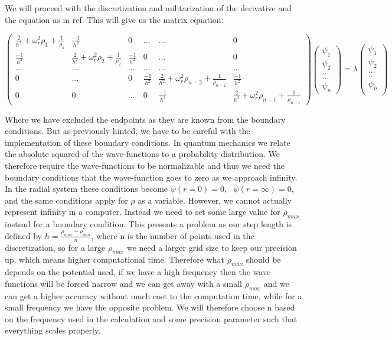 \documentclass[a4paper,11pt]{article}
\begin{document}
{We will proceed with the discretization and militarization of the derivative and the equation as in ref\cite{Project1}. This will give us the matrix equation:


\begin{equation}
\begin{pmatrix}
	\frac{2}{h^2} + \omega_r^2 \rho_1 + \frac{1}{\rho_1} & \frac{-1}{h^2} & 0 & ... & ... & 0 \\
	\frac{-1}{h^2} & \frac{2}{h^2} + \omega_r^2 \rho_2 + \frac{1}{\rho_2} & \frac{-1}{h^2} & 0 & ... & 0 \\
	... & ... & ... & ... & ... & ... \\
	0 & ... & 0 & \frac{-1}{h^2} & \frac{2}{h^2} + \omega_r^2 \rho_{n-2} + \frac{1}{\rho_{n-2}} & \frac{-1}{h^2} \\
	0 & 0 & ... & 0 & \frac{-1}{h^2} & \frac{2}{h^2} + \omega_r^2 \rho_{n-1} + \frac{1}{\rho_{n-1}} 
	\end{pmatrix} \begin{pmatrix}
	\psi_1\\
	\psi_2\\
	...\\
	...\\
	\psi_n
	\end{pmatrix} = \lambda \begin{pmatrix}
	\psi_1 \\
	\psi_2  \\
	... \\
	... \\
	\psi_n  \\
	\end{pmatrix}
\end{equation}		

Where we have excluded the endpoints as they are known from the boundary conditions. But as previously hinted, we have to be careful with the implementation of these boundary conditions. In quantum mechanics we relate the absolute squared of the wave-functions to a probability distribution. We therefore require the wave-functions to be normalizable and thus we need the boundary conditions that the wave-function goes to zero as we approach infinity. In the radial system these conditions become $\psi(r=0) = 0, \: \: \: \psi(r=\infty) = 0$, and the same conditions apply for $\rho$ as a variable. However, we cannot actually represent infinity in a computer. Instead we need to set some large value for $\rho_{max}$ instead for a boundary condition. This presents a problem as our step length is defined by $h = \frac{\rho_{max}-\rho_{min}}{n}$, where n is the number of points used in the discretization, so for a large $\rho_{max}$ we need a larger grid size to keep our precision up, which means higher computational time. Therefore what $\rho_{max}$ should be depends on the potential used, if we have a high frequency then the wave functions will be forced narrow and we can get away with a small $\rho_{max}$ and we can get a higher accuracy without much cost to the computation time, while for a small frequency we have the opposite problem. We will therefore choose n based on the frequency used in the calculation and some precision parameter such that everything scales properly. \\

}
\end{document}

